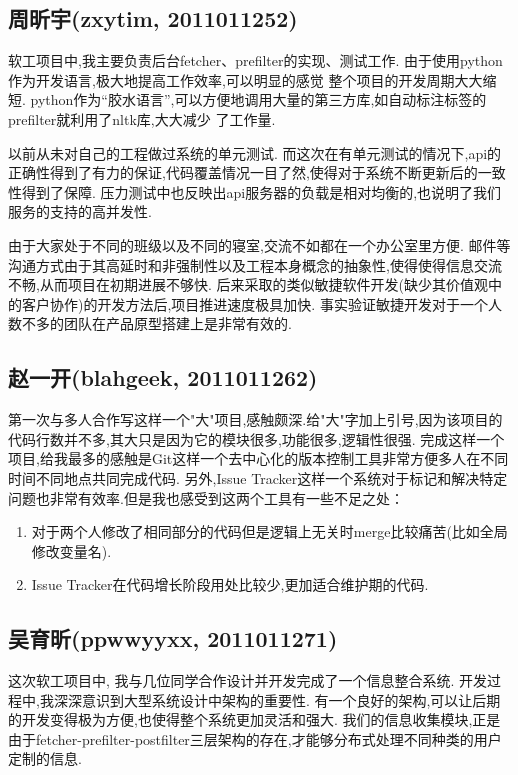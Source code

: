 \subsection{周昕宇(zxytim, 2011011252)}
  软工项目中,我主要负责后台fetcher、prefilter的实现、测试工作.
  由于使用python作为开发语言,极大地提高工作效率,可以明显的感觉 整个项目的开发周期大大缩短.
  python作为“胶水语言”,可以方便地调用大量的第三方库,如自动标注标签的prefilter就利用了nltk库,大大减少 了工作量.

  以前从未对自己的工程做过系统的单元测试.
  而这次在有单元测试的情况下,api的正确性得到了有力的保证,代码覆盖情况一目了然,使得对于系统不断更新后的一致性得到了保障.
  压力测试中也反映出api服务器的负载是相对均衡的,也说明了我们服务的支持的高并发性.

  由于大家处于不同的班级以及不同的寝室,交流不如都在一个办公室里方便.
  邮件等沟通方式由于其高延时和非强制性以及工程本身概念的抽象性,使得使得信息交流不畅,从而项目在初期进展不够快.
  后来采取的类似敏捷软件开发(缺少其价值观中的客户协作)的开发方法后,项目推进速度极具加快.
  事实验证敏捷开发对于一个人数不多的团队在产品原型搭建上是非常有效的.

\subsection{赵一开(blahgeek, 2011011262)}
  第一次与多人合作写这样一个"大"项目,感触颇深.给"大"字加上引号,因为该项目的代码行数并不多,其大只是因为它的模块很多,功能很多,逻辑性很强.
  完成这样一个项目,给我最多的感触是Git这样一个去中心化的版本控制工具非常方便多人在不同时间不同地点共同完成代码.
  另外,Issue Tracker这样一个系统对于标记和解决特定问题也非常有效率.但是我也感受到这两个工具有一些不足之处：

  \begin{enumerate}
    \item 对于两个人修改了相同部分的代码但是逻辑上无关时merge比较痛苦(比如全局修改变量名).
    \item Issue Tracker在代码增长阶段用处比较少,更加适合维护期的代码.
  \end{enumerate}

\subsection{吴育昕(ppwwyyxx, 2011011271)}
  这次软工项目中, 我与几位同学合作设计并开发完成了一个信息整合系统.
  开发过程中,我深深意识到大型系统设计中架构的重要性.
  有一个良好的架构,可以让后期的开发变得极为方便,也使得整个系统更加灵活和强大.
  我们的信息收集模块,正是由于fetcher-prefilter-postfilter三层架构的存在,才能够分布式处理不同种类的用户定制的信息.

